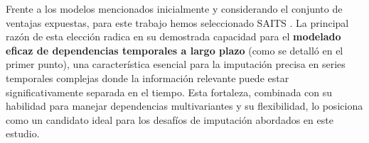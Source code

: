 Frente a los modelos mencionados inicialmente y considerando el conjunto de ventajas expuestas, para este trabajo hemos seleccionado SAITS \citep{Du2023SAITS}. La principal razón de esta elección radica en su demostrada capacidad para el \textbf{modelado eficaz de dependencias temporales a largo plazo} (como se detalló en el primer punto), una característica esencial para la imputación precisa en series temporales complejas donde la información relevante puede estar significativamente separada en el tiempo. Esta fortaleza, combinada con su habilidad para manejar dependencias multivariantes y su flexibilidad, lo posiciona como un candidato ideal para los desafíos de imputación abordados en este estudio.

